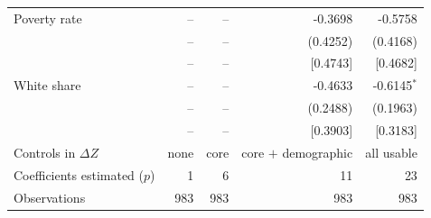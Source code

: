 \begin{tabular}{lrrrr}
Poverty rate & -- & -- & -0.3698 & -0.5758 \\
 & -- & -- & (0.4252) & (0.4168) \\
 & -- & -- & [0.4743] & [0.4682] \\
White share & -- & -- & -0.4633 & -0.6145$^{*}$ \\
 & -- & -- & (0.2488) & (0.1963) \\
 & -- & -- & [0.3903] & [0.3183] \\
\midrule
Controls in $\Delta Z$ & none & core & core $+$ demographic & all usable \\
Coefficients estimated ($p$) & 1 & 6 & 11 & 23 \\
Observations & 983 & 983 & 983 & 983 \\
\bottomrule
\end{tabular}
